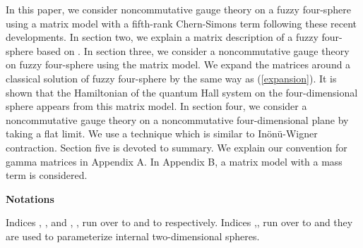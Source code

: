 \documentclass[a4paper,11pt]{article}
\begin{document}
In this paper, we consider noncommutative gauge theory on 
a fuzzy four-sphere using a matrix model 
with a fifth-rank Chern-Simons term 
following these recent developments. 
In section two, we explain a matrix description of 
a fuzzy four-sphere based on \cite{castelino}. 
In section three, we consider a noncommutative 
gauge theory on fuzzy four-sphere using the matrix model. 
We expand the matrices around a classical solution of fuzzy four-sphere 
by the same way as (\ref{expansion}). 
It is shown that the Hamiltonian of the quantum Hall system 
on the four-dimensional sphere appears from this 
matrix model. 
In section four, we consider a noncommutative gauge theory 
on a noncommutative four-dimensional plane by taking a flat limit. 
We use a technique which is similar to 
In\"{o}n\"{u}-Wigner contraction. 
Section five is devoted to summary. 
We explain our convention for gamma matrices in Appendix A. 
In Appendix B, a matrix model with a mass term is 
considered. 

\vspace{0.4cm}
\noindent 
{\bf Notations} 

Indices \myHighlight{$\mu$}\coordHE{}, \myHighlight{$\nu$}\coordHE{}, \myHighlight{$\ldots$}\coordHE{} 
and \coordHE{}, \coordHE{}, \myHighlight{$\ldots$}\coordHE{} run over \coordHE{} to \coordHE{} 
and \coordHE{} to \coordHE{} respectively. 
Indices \coordHE{},\coordHE{},\coordHE{} run over \coordHE{} to \coordHE{} and 
they are used to parameterize 
internal two-dimensional spheres. 

\end{document}
